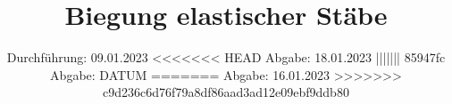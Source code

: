 

\subject{V103}
\title{%
Biegung elastischer Stäbe}
\date{%
  Durchführung: 09.01.2023
  \hspace{3em}
<<<<<<< HEAD
  Abgabe: 18.01.2023
||||||| 85947fc
  Abgabe: DATUM
=======
  Abgabe: 16.01.2023
>>>>>>> c9d236c6d76f79a8df86aad3ad12e09ebf9ddb80
}



\maketitle
\thispagestyle{empty}
\tableofcontents
\newpage






\printbibliography{}


